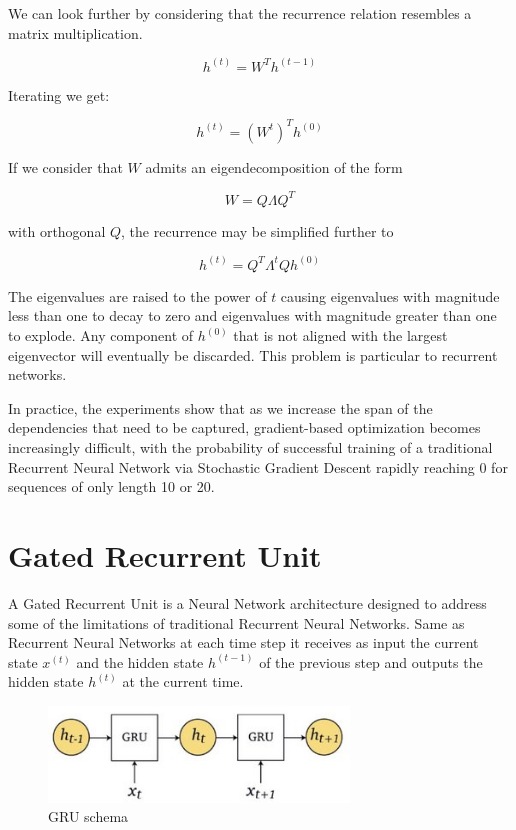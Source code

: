 \noindent We can look further by considering that the recurrence relation resembles a matrix multiplication.

$$h^{(t)} = W^{T} h^{(t-1)}$$

\noindent Iterating we get:

$$h^{(t)} = \left(W^{t} \right) ^T   h^{(0)}$$

\noindent If we consider that $W$ admits an eigendecomposition of the form

$$ W = Q \Lambda Q^T $$

\noindent with orthogonal $Q$, the recurrence may be simpliﬁed further to

$$ h^{(t)} = Q^T \Lambda^t Q h^{(0)} $$

\noindent The eigenvalues are raised to the power of $t$ causing eigenvalues with magnitude less than one to decay to zero and eigenvalues with magnitude greater than one to explode. Any component of $h^{(0)}$ that is not aligned with the largest eigenvector will eventually be discarded. This problem is particular to recurrent networks.

\noindent In practice, the experiments show that as we increase the span of the dependencies that need to be captured, gradient-based optimization becomes increasingly diﬃcult, with the probability of successful training of a traditional Recurrent Neural Network via Stochastic Gradient Descent rapidly reaching 0 for sequences of only length 10 or 20.

\newpage
\section{Gated Recurrent Unit}

A Gated Recurrent Unit is a Neural Network architecture designed to address some of the limitations of traditional Recurrent Neural Networks. Same as Recurrent Neural Networks at each time step it receives as input the current state $x^{(t)}$ and the hidden state $h^{(t-1)}$ of the previous step and outputs the hidden state $h^{(t)}$ at the current time.

\begin{figure}[h]
    \centering
    \includegraphics[width=8cm]{Images/gru-schema.jpg}
    \caption{GRU schema}
    \label{fig:gru-schema}
\end{figure}

